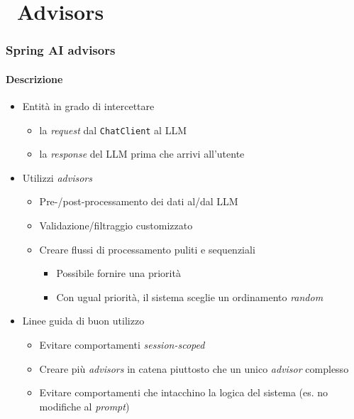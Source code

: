 \section{\faWrench\ Advisors} %
\label{sec:spring-ai-advisors}
%
\begin{frame}[t,fragile] \frametitle{Spring AI advisors}
    \framesubtitle{Descrizione}
    {\footnotesize
    \begin{itemize}[leftmargin=10pt,align=right]
        \item[\alert{\faArrowCircleRight}] Entità in grado di intercettare
        \begin{itemize}[leftmargin=10pt,align=right]
            \item[\alert{\faArrowCircleRight}] la \textit{request} dal \texttt{ChatClient} al LLM
            \item[\alert{\faArrowCircleRight}] la \textit{response} del LLM prima che arrivi all'utente
        \end{itemize}
        \item[\alert{\faArrowCircleRight}] Utilizzi \textit{advisors}
        \begin{itemize}[leftmargin=10pt,align=right]
            \item[\alert{\faArrowCircleRight}] Pre-/post-processamento dei dati al/dal LLM
            \item[\alert{\faArrowCircleRight}] Validazione/filtraggio customizzato
            \item[\alert{\faArrowCircleRight}] Creare flussi di processamento puliti e sequenziali
            \begin{itemize}[leftmargin=10pt,align=right]
                \item[\alert{\faExclamationTriangle}] Possibile fornire una priorità
                \item[\alert{\faExclamationTriangle}] Con ugual priorità, il sistema sceglie un ordinamento \textit{random}
            \end{itemize}
        \end{itemize}
        \item[\alert{\faArrowCircleRight}] Linee guida di buon utilizzo
        \begin{itemize}[leftmargin=10pt,align=right]
            \item[\alert{\faArrowCircleRight}] Evitare comportamenti \textit{session-scoped}
            \item[\alert{\faArrowCircleRight}] Creare più \textit{advisors} in catena piuttosto che un unico \textit{advisor} complesso
            \item[\alert{\faArrowCircleRight}] Evitare comportamenti che intacchino la logica del sistema (es. \alert{no modifiche al \textit{prompt}})
        \end{itemize}
    \end{itemize}
    }
\end{frame}
